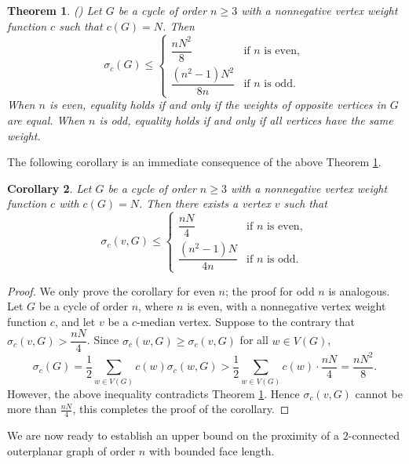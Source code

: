 \documentclass[a4paper,11pt]{article}
\newtheorem{theorem}{Theorem}[section]
\newtheorem{corollary}[theorem]%
{Corollary}
\numberwithin{equation}{theorem}
\begin{document}
 \begin{theorem}{\rm (\cite{Dan2012})}
\label{theo:total-weighted-distance-of-cycle-ch4}
Let $G$ be a cycle of order $n \geq 3$ with a nonnegative vertex weight function $c$ such that $c(G)=N$. Then
\[
\sigma_c(G) \leq
\begin{cases} 
\dfrac{nN^2}{8}  & \text{if } n \text{ is even}, \\[10pt]
\dfrac{(n^2-1)N^2}{8n}  & \text{if } n \text{ is odd}.
\end{cases}
\]
When $n$ is even, equality holds if and only if the weights of opposite vertices in $G$ are equal. When $n$ is odd, equality holds if and only if all vertices have the same weight.
\end{theorem}

The following corollary is an immediate consequence of the above Theorem \ref{theo:total-weighted-distance-of-cycle-ch4}.

\begin{corollary}
\label{coro:c-median-vertex-of-a-weighted-cycle}
Let $G$ be a cycle of order $n \geq 3$ with a nonnegative vertex weight function $c$ with $c(G)=N$. 
Then there exists a vertex $v$ such that 
\[
\sigma_c(v, G) \leq
\begin{cases} 
\dfrac{nN}{4}  & \text{if } n \text{ is even}, \\[10pt]
\dfrac{(n^2-1)N}{4n}  & \text{if } n \text{ is odd}.
\end{cases}
\]
\end{corollary}

\begin{proof} 
We only prove the corollary for even $n$; the proof for odd $n$ is analogous. 
Let \( G \) be a cycle of order \( n \), where $n$ is even, with a nonnegative vertex weight function 
\( c \), and let \( v \) be a \( c \)-median vertex. Suppose to the contrary that 
\( \sigma_c(v, G) > \dfrac{nN}{4} \). Since $\sigma_c(w,G) \geq \sigma_c(v,G)$ for all $w\in V(G)$, 
\[
\sigma_c(G) = \frac{1}{2}\sum_{w \in V(G)} c(w) \sigma_c(w, G) > \frac{1}{2}\sum_{w \in V(G)} c(w) \cdot \frac{nN}{4} = \frac{nN^2}{8}.
\]
However, the above inequality contradicts Theorem \ref{theo:total-weighted-distance-of-cycle-ch4}. 
Hence $\sigma_c(v, G)$ cannot be more than $\frac{nN}{4}$, this completes the proof of the corollary.
\end{proof}

We are now ready to establish an upper bound on the proximity of a $2$-connected outerplanar graph of order 
$n$ with bounded face length.
\end{document}
